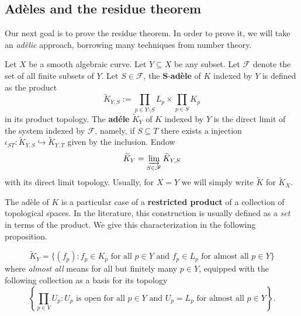 \subsection{Adèles and the residue theorem}
Our next goal is to prove the residue theorem. In order to prove it, we will take an \textit{adèlic} approach, borrowing many techniques from number theory.
\begin{definition}\label{def:adele-ring-over-algebraic-curve}
	Let $X$ be a smooth algebraic curve. Let $Y \subseteq X$ be any subset. Let $\mathscr{F}$ denote the set of all finite subsets of $Y$. Let $S \in \mathscr{F}$, the $\mathbf{S}$-\textbf{adèle} of $K$ indexed by $Y$ is defined as the product
	\[
		\widetilde{K}_{Y,S} := \prod_{p\in Y\setminus S}L_{p} \times \prod_{p\in S}K_{p}
	\]
	in its product topology. The \textbf{adéle} $\widetilde{K}_{Y}$ of $K$ indexed by $Y$ is the direct limit of the system indexed by $\mathscr{F}$, namely, if $S \subseteq T$ there exists a injection $\iota_{ST}\colon \widetilde{K}_{Y,S} \hookrightarrow \widetilde{K}_{Y,T}$ given by the inclusion. Endow
	\[
		\widetilde{K}_{Y} = \varinjlim_{S \in \mathscr{F}} \widetilde{K}_{Y,S}
	\]
	with its direct limit topology. Usually, for $X = Y$ we will simply write $\widetilde{K}$ for $\widetilde{K}_{X}$.
\end{definition}
The adèle of $K$ is a particular case of a \textbf{restricted product} of a collection of topological spaces. In the literature, this construction is usually defined as a \textit{set} in terms of the product. We give this characterization in the following proposition.
\begin{proposition}\label{prop:adèle-as-subset-of-product}
	\[
		\widetilde{K}_{Y} = \{(f_{p})\colon f_{p} \in K_{p}\text{ for all }p \in Y\text{ and }f_{p}\in L_{p}\text{ for almost all }p\in Y\}
	\]
	where \textit{almost all} means for all but finitely many $p\in Y$, equipped with the following collection as a basis for its topology
	\[
		\left\{\prod_{p\in Y} U_{p} \colon U_{p}\text{ is open for all }p\in Y\text{ and }U_{p} = L_{p}\text{ for almost all }p\in Y\right\}.
	\]
\end{proposition}
